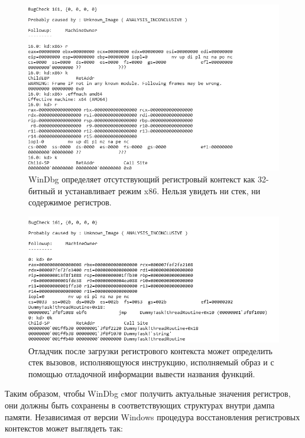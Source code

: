 \documentclass{mipt-thesis-bs}
\begin{document}
\begin{figure}[h]
\begin{center}
    \captionsetup{justification=centering}
    \includegraphics[width=1\textwidth]{ctx1.png}
    \caption{WinDbg определяет отсутствующий регистровый контекст как 32-битный и устанавливает режим x86. Нельзя увидеть ни стек, ни содержимое регистров.}
    \label{fig:ctx1}
\end{center}
\end{figure}

\begin{figure}[h]
\begin{center}
    \captionsetup{justification=centering}
    \includegraphics[width=1\textwidth]{ctx2.png}
    \caption{Отладчик после загрузки регистрового контекста может определить стек вызовов, исполняющуюся инструкцию, исполняемый образ и с помощью отладочной информации вывести названия функций.}
    \label{fig:ctx2}
\end{center}
\end{figure}

\newpage
Таким образом, чтобы WinDbg cмог получить актуальные значения регистров, они должны быть сохранены в соответствующих структурах внутри дампа памяти. Независимая от версии Windows процедура восстановления регистровых контекстов может выглядеть так:
\end{document}
